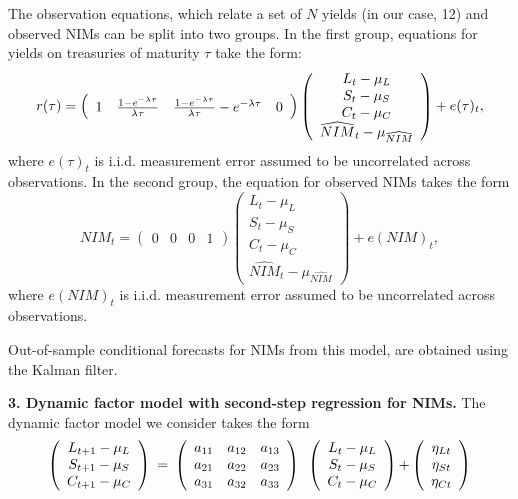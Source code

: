 \documentclass[11pt]{article}
\begin{document}
The observation equations, which relate a set of $N$ yields (in our case, 12) and observed NIMs can be split into two groups. In the first group, equations for yields on treasuries of maturity $\tau $ take the form:
\[
r(\tau )=\left(
\begin{array}{cccc}
1 & \frac{1-e^{-\lambda \tau }}{\lambda \tau } & \frac{1-e^{-\lambda \tau }}{%
\lambda \tau }-e^{-\lambda \tau } & 0%
\end{array}%
\right) \left(
\begin{array}{c}
{L_{t}-\mu _{L}} \\
{S_{t}-\mu _{S}} \\
{C_{t}-\mu _{C}} \\
\widehat{NIM}_{t}-\mu _{\widehat{NIM}}%
\end{array}%
\right) +e(\tau )_{t},
\]%
where $e(\tau )_{t}$ is i.i.d. measurement error assumed to be uncorrelated
across observations. \bigskip In the second group, the equation for observed
NIMs takes the form%
\[
NIM_{t}=\left(
\begin{array}{cccc}
0 & 0 & 0 & 1%
\end{array}%
\right) \left(
\begin{array}{c}
{L_{t}-\mu _{L}} \\
{S_{t}-\mu _{S}} \\
{C_{t}-\mu _{C}} \\
\widehat{NIM}_{t}-\mu _{\widehat{NIM}}%
\end{array}%
\right) +e(NIM)_{t},
\]
where $e(NIM)_{t}$ is i.i.d. measurement error assumed to be uncorrelated across observations.

Out-of-sample conditional forecasts for NIMs from this model, are obtained using the Kalman filter.

\noindent \textbf{3. Dynamic factor model with second-step regression for NIMs.} The dynamic factor model we consider takes the form
\[
\left(
\begin{array}{c}
{L_{t+1}-\mu _{L}} \\
{S_{t+1}-\mu _{S}} \\
{C_{t+1}-\mu _{C}}%
\end{array}%
\right) {\normalsize \ =\ }\left(
\begin{array}{ccc}
a_{11} & a_{12} & a_{13} \\
a_{21} & a_{22} & a_{23} \\
a_{31} & a_{32} & a_{33}%
\end{array}%
\right) {\normalsize \ }\left(
\begin{array}{c}
{L_{t}-\mu _{L}} \\
{S_{t}-\mu _{S}} \\
{C_{t}-\mu _{C}}%
\end{array}%
\right) {\normalsize +}\left(
\begin{array}{c}
{\eta _{Lt}} \\
{\eta _{St}} \\
{\eta _{Ct}}%
\end{array}%
\right)
\]
\end{document}
